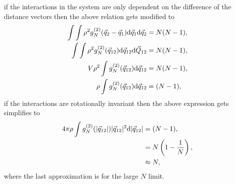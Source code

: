 \documentclass[a4paper]{article}
\begin{document}
if the interactions in the system are only dependent on the difference of the distance vectors then the above relation gets modified to
\begin{equation}
\begin{split}
\int\int\rho^{2}g^{(2)}_{N}(\vec{q}_{2}-\vec{q}_{1}){\rm d}\vec{q}_{1}{\rm d}\vec{q}_{2}&=N(N-1),\\
\int\int\rho^{2}g^{(2)}_{N}(\vec{q}_{12}){\rm d}\vec{q}_{12}{\rm d}\vec{Q}_{12}&=N(N-1),\\
V\rho^{2}\int g^{(2)}_{N}(\vec{q}_{12}){\rm d}\vec{q}_{12}&=N(N-1),\\
\rho\int g^{(2)}_{N}(\vec{q}_{12}){\rm d}\vec{q}_{12}&=(N-1),\\
\end{split}
\end{equation}
if the interactions are rotationally invariant then the above expression gets simplifies to
\begin{equation}
\begin{split}
4\pi\rho\int g^{(2)}_{N}(|\vec{q}_{12}|)|\vec{q}_{12}|^{2}{\rm d}|\vec{q}_{12}|&=(N-1),\\
&=N\left(1-\frac{1}{N}\right),\\
&\approx N,
\end{split}
\end{equation}
where the last approximation is for the large $N$ limit.
\end{document}
